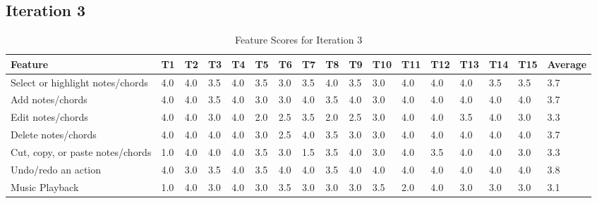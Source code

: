 		\subsection{Iteration 3} %
		\label{sub:iteration_3}
		
			\begin{landscape}				
				\begin{longtable}{|p{3.5cm}|R{.7cm}|R{.7cm}|R{.7cm}|R{.7cm}|R{.7cm}|R{.7cm}|R{.7cm}|R{.7cm}|R{.7cm}|R{.7cm}|R{.7cm}|R{.7cm}|R{.7cm}|R{.7cm}|R{.7cm}|R{1.5cm}|}
					\caption{Feature Scores for Iteration 3} \label{tab:results-features-it3} \\
					  	\hline
					  	\textbf{Feature} & \textbf{T1} & \textbf{T2} & \textbf{T3} & \textbf{T4} & \textbf{T5} & \textbf{T6} & \textbf{T7} & \textbf{T8} & \textbf{T9} & \textbf{T10} & \textbf{T11}& \textbf{T12} & \textbf{T13} & \textbf{T14} & \textbf{T15} & \textbf{Average} \\ \hline
						
					  	Select or highlight notes/chords 		& 4.0 & 4.0 & 3.5 & 4.0 & 3.5 & 3.0 & 3.5 & 4.0 & 3.5 & 3.0 & 4.0 & 4.0 & 4.0 & 3.5 & 3.5 & 3.7 \\ \hline
						Add notes/chords 							& 4.0 & 4.0 & 3.5 & 4.0 & 3.0 & 3.0 & 4.0 & 3.5 & 4.0 & 3.0 & 4.0 & 4.0 & 4.0 & 4.0 & 4.0 & 3.7 \\ \hline
						Edit notes/chords 							& 4.0 & 4.0 & 3.0 & 4.0 & 2.0 & 2.5 & 3.5 & 2.0 & 2.5 & 3.0 & 4.0 & 4.0 & 3.5 & 4.0 & 3.0 & 3.3 \\ \hline
						Delete notes/chords 						& 4.0 & 4.0 & 4.0 & 4.0 & 3.0 & 2.5 & 4.0 & 3.5 & 3.0 & 3.0 & 4.0 & 4.0 & 4.0 & 4.0 & 4.0 & 3.7 \\ \hline
						Cut, copy, or paste notes/chords 	& 1.0 & 4.0 & 4.0 & 4.0 & 3.5 & 3.0 & 1.5 & 3.5 & 4.0 & 3.0 & 4.0 & 3.5 & 4.0 & 4.0 & 3.0 & 3.3 \\ \hline
						Undo/redo an action 						& 4.0 & 3.0 & 3.5 & 4.0 & 3.5 & 4.0 & 4.0 & 3.5 & 4.0 & 4.0 & 4.0 & 4.0 & 4.0 & 4.0 & 4.0 & 3.8 \\ \hline
						Music Playback 								& 1.0 & 4.0 & 3.0 & 4.0 & 3.0 & 3.5 & 3.0 & 3.0 & 3.0 & 3.5 & 2.0 & 4.0 & 3.0 & 3.0 & 3.0 & 3.1 \\ \hline

				\end{longtable}
			\end{landscape}

